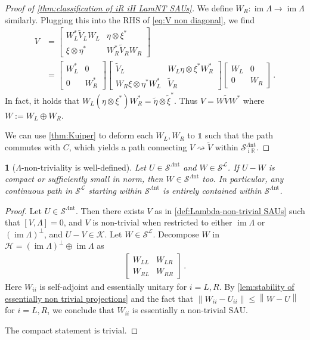 \documentclass[a4paper,10pt]{article}
\numberwithin{equation}{section}
\theoremstyle{plain}
\theoremstyle{plain}
\newtheorem{lem}[thm]{\protect\lemmaname}
\theoremstyle{plain}
\theoremstyle{plain}
\theoremstyle{plain}
\theoremstyle{remark}
\theoremstyle{definition}
\theoremstyle{plain}
\providecommand{\lemmaname}{Lemma}
\newcommand{\ii}{\operatorname{i}}
\newcommand{\RR}{\mathbb{R}}
\newcommand{\calSU}{\mathcal{S}}
\newcommand{\calH}{\mathcal{H}}
\newcommand{\calK}{\mathcal{K}}
\newcommand{\calL}{\mathcal{L}}
\newcommand{\ti}[1]{\widetilde{#1}}
\newcommand{\LamNT}{\Lambda\mathrm{nt}}
\newcommand{\LamNTSAU}{\calSU^{\LamNT}}
\newcommand\norm[1]{\left\lVert#1\right\rVert}
\newcommand{\Id}{\mathds{1}}
\newcommand{\im}{\operatorname{im}}
\newcommand{\eq}[1]{\begin{align*}#1\end{align*}}
\begin{document}
\begin{proof}[Proof of \cref{thm:classification of iR iH LamNT SAUs}]
		We define $W_{R}:\im\Lambda\to\im\Lambda$ similarly. Plugging this into the RHS of \cref{eq:V non diagonal}, we find \eq{V &=\begin{bmatrix}W_{L}^\ast\ti{V}_{L}W_{L} & \eta\otimes \xi^* \\ \xi\otimes\eta^* & W_{R}^\ast\ti{V}_{R}W_{R}\end{bmatrix} \\ &=\begin{bmatrix}W_{L}^* & 0 \\ 0 & W_{R}^*\end{bmatrix} \begin{bmatrix}\ti{V}_{L} & W_{L} \eta\otimes \xi^* W_{R}^* \\ W_{R} \xi\otimes\eta^* W_{L}^* & \ti{V}_{R}\end{bmatrix}\begin{bmatrix}W_{L} & 0 \\ 0 & W_{R}\end{bmatrix}\,.} In fact, it holds that $W_{L} (\eta\otimes \xi^* )W_{R}^*=\ti{\eta}\otimes\ti{\xi}^*$. Thus $V=W\ti{V}W^*$ where $W:=W_{L}\oplus W_{R}$.
		
		We can use \cref{thm:Kuiper} to deform each $W_{L},W_{R}$ to $\Id$ such that the path commutes with $C$, which yields a path connecting $V\rightsquigarrow \ti V$ within $\LamNTSAU_{\ii \RR}$.
	\end{proof}
	
	
	\begin{lem}[$\Lambda$-non-triviality is well-defined]\label{lem:lambda-non-triviality is well-defined}
		Let $U\in\LamNTSAU$ and $W\in \calSU^\calL$. If $U-W$ is compact or sufficiently small in norm, then $W\in\LamNTSAU$ too. In particular, any continuous path in $\calSU^\calL$ starting within $\LamNTSAU$ is entirely contained within $\LamNTSAU$.
	\end{lem}
	\begin{proof}
		Let $U\in\LamNTSAU$. Then there exists $V$ as in \cref{def:Lambda-non-trivial SAUs} such that $[V,\Lambda]=0$, and $V$ is non-trivial when restricted to either $\im\Lambda$ or $(\im \Lambda)^\perp$, and $U-V\in\calK$. Let $W\in\calSU^\calL$. Decompose $W$ in $\calH= (\im\Lambda)^\perp \oplus \im\Lambda$ as \eq{\begin{bmatrix}W_{LL} & W_{LR} \\ W_{RL} & W_{RR}\end{bmatrix}\,.} Here $W_{ii}$ is self-adjoint and essentially unitary for $i=L,R$. By \cref{lem:stability of essentially non trivial projections} and the fact that $\norm{W_{ii}-U_{ii}}\leq\norm{W-U}$ for $i=L,R$, we conclude that $W_{ii}$ is essentially a non-trivial SAU.
		
		
		The compact statement is trivial.
	\end{proof}
	
\end{document}
